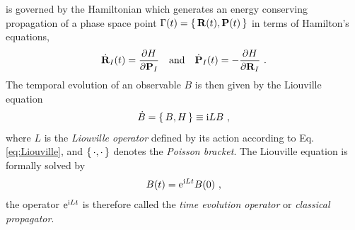  is governed by the Hamiltonian which generates an energy conserving propagation of a phase space point $\Gamma (t) = \set{{\bf R} (t), {\bf P} (t)}$ in terms of Hamilton's equations,
\begin{align}
	\dot{\b R}_I (t) = \frac{\partial H}{\partial \b P_I} \quad\text{and}\quad
	\dot{\b P}_I (t) = -\frac{\partial H}{\partial \b R_I}~.
	\label{eq:stat.eom}
\end{align}
The temporal evolution of an observable $B$ is then given by the Liouville equation~\cite{Tuckerman}
\begin{align}
	\dot{B} = \set{B, H} \equiv \im L B~,
	\label{eq:Liouville}
\end{align}
where $L$ is the \emph{Liouville operator} defined by its action according to Eq.\,\eqref{eq:Liouville}, and $\set{\cdot , \cdot}$ denotes the \emph{Poisson bracket}.
The Liouville equation is formally solved by
\begin{align}
	B (t) = {\rm e}^{\im L t} B(0)~,
	\label{eq:B.time.evolution}
\end{align}
the operator ${\rm e}^{{\rm i} L t}$ is therefore called the \emph{time evolution operator} or \emph{classical propagator}.
